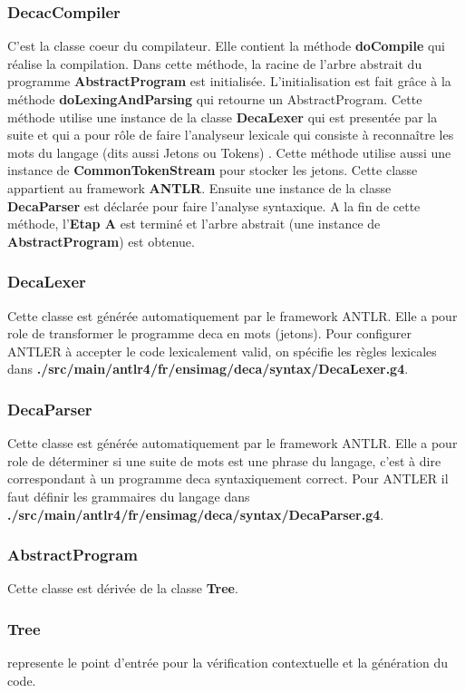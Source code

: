 \documentclass[12pt, a4paper, one side]{article}
\begin{document}
    \subsubsection{DecacCompiler} C'est la classe coeur du compilateur. Elle contient la méthode \textbf{doCompile} qui réalise la compilation. Dans cette méthode, la racine de l'arbre abstrait du programme \textbf{AbstractProgram} est initialisée. L'initialisation est fait grâce à la méthode \textbf{doLexingAndParsing} qui retourne un AbstractProgram. Cette méthode utilise une instance de la classe \textbf{DecaLexer} qui est presentée par la suite et qui a pour rôle de faire l'analyseur lexicale qui consiste à reconnaître les mots du langage (dits aussi Jetons ou Tokens) . Cette méthode utilise aussi une instance de \textbf{CommonTokenStream} pour stocker les
    jetons. Cette classe appartient au framework \textbf{ANTLR}. Ensuite une instance de la classe \textbf{DecaParser} est déclarée pour faire l'analyse syntaxique. A la fin de cette méthode, l'\textbf{Etap A} est terminé et l'arbre abstrait (une instance de \textbf{AbstractProgram}) est obtenue.

    \subsubsection{DecaLexer} Cette classe est générée automatiquement par le framework ANTLR. Elle a pour role de transformer le programme deca en mots (jetons). Pour configurer ANTLER à accepter le code lexicalement valid, on spécifie les règles lexicales dans \textbf{./src/main/antlr4/fr/ensimag/deca/syntax/DecaLexer.g4}.

    \subsubsection{DecaParser} Cette classe est générée automatiquement par le framework ANTLR. Elle a pour role de déterminer si une suite de mots est une phrase du langage, c'est à dire correspondant à un programme deca syntaxiquement correct. Pour ANTLER il faut définir les grammaires du langage dans \textbf{./src/main/antlr4/fr/ensimag/deca/syntax/DecaParser.g4}.
    \subsubsection{AbstractProgram} Cette classe est dérivée de la classe \textbf{Tree}.

    \subsubsection{Tree} represente le point d'entrée pour la vérification contextuelle et la génération du code.
\end{document}
